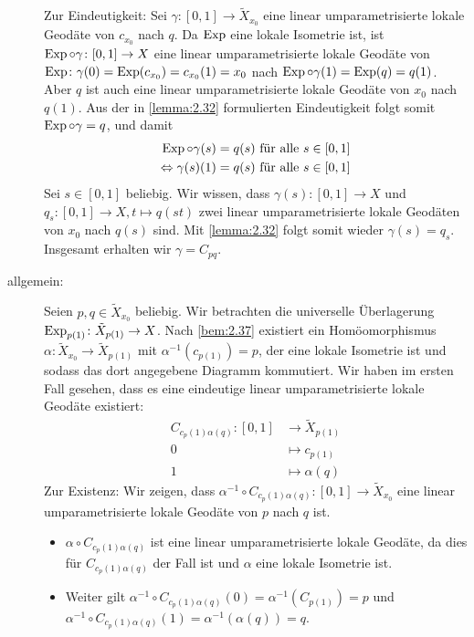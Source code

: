 \begin{beweis}
\begin{description}
		Zur Eindeutigkeit: Sei $\gamma\colon [0,1] \rightarrow \tilde{X}_{x_0}$ eine linear umparametrisierte lokale Geodäte von $c_{x_0}$ nach $q$.
		Da $\operatorname{Exp}$ eine lokale Isometrie ist, ist $\operatorname{Exp} \circ \gamma \colon [0,1] \rightarrow X$ eine linear umparametrisierte lokale Geodäte von $\operatorname{Exp} \colon \gamma(0) = \operatorname{Exp}(c_{x_0}) = c_{x_0}(1) = x_0$ nach $\operatorname{Exp} \circ \gamma(1) = \operatorname{Exp}(q) = q(1)$.
		Aber $q$ ist auch eine linear umparametrisierte lokale Geodäte von $x_0$ nach $q(1)$.
		Aus der in \autoref{lemma:2.32} formulierten Eindeutigkeit folgt somit $\operatorname{Exp} \circ \gamma = q$, und damit
		\begin{align*}
			\operatorname{Exp} \circ \gamma(s) &= q(s) \text{ für alle } s \in [0,1] \\
			\Leftrightarrow \gamma(s)(1) &= q(s) \text{ für alle } s \in [0,1]
		\end{align*}
		Sei $s \in [0,1]$ beliebig.
		Wir wissen, dass $\gamma(s) \colon [0,1] \rightarrow X$ und $ q_s\colon [0,1] \rightarrow X, t \mapsto q(st)$ zwei linear umparametrisierte lokale Geodäten von $x_0$ nach $q(s)$ sind.
		Mit \autoref{lemma:2.32} folgt somit wieder $\gamma(s) = q_s$.
		Insgesamt erhalten wir $\gamma = C_{pq}$.
		\item[allgemein:] Seien $p,q \in \tilde{X}_{x_0}$ beliebig.
		Wir betrachten die universelle Überlagerung $\operatorname{Exp}_{p(1)} \colon \tilde{X}_{p(1)} \rightarrow X$.
		Nach \autoref{bem:2.37} existiert ein Homöomorphismus $\alpha \colon \tilde{X}_{x_0} \rightarrow \tilde{X}_{p(1)}$ mit $\alpha^{-1}(c_{p(1)}) = p$, der eine lokale Isometrie ist und sodass das dort angegebene Diagramm kommutiert.
		Wir haben im ersten Fall gesehen, dass es eine eindeutige linear umparametrisierte lokale Geodäte existiert:
		\begin{align*}
			C_{c_p(1)\alpha(q)} \colon [0,1] &\longrightarrow \tilde{X}_{p(1)} \\
			0 &\longmapsto c_{p(1)} \\
			1 &\longmapsto \alpha(q)
		\end{align*}
		Zur Existenz:
		Wir zeigen, dass $\alpha^{-1} \circ C_{c_p(1)\alpha(q)}\colon [0,1] \rightarrow \tilde{X}_{x_0}$ eine linear umparametrisierte lokale Geodäte von $p$ nach $q$ ist.
		\newpage
		\begin{itemize}
			\item $\alpha \circ C_{c_p(1)\alpha(q)}$ ist eine linear umparametrisierte lokale Geodäte, da dies für $C_{c_p(1)\alpha(q)}$ der Fall ist und $\alpha$ eine lokale Isometrie ist.
			\item Weiter gilt $\alpha^{-1} \circ C_{c_p(1)\alpha(q)}(0) = \alpha^{-1}(C_{p(1)}) = p$ und $\alpha^{-1} \circ C_{c_p(1)\alpha(q)}(1) = \alpha^{-1}(\alpha(q)) = q$.
		\end{itemize}
		

\end{description}
\end{beweis}
